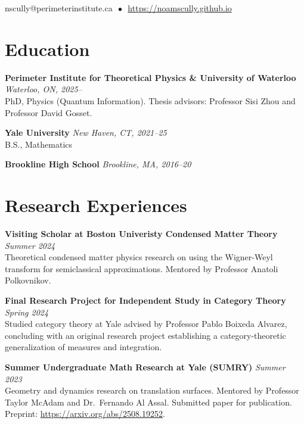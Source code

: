 \documentclass[11pt]{article}
\newcommand{\entry}[3]{
    \vspace{-.58em}
    \textbf{#1} \hfill \textit{#2} \\
    #3 \vspace{0.5em}}
\begin{document}
\begin{center}

  
  \vspace{-.1em}
  \hspace{-.8em}
  nscully@perimeterinstitute.ca $\, \bullet \,$ \href{https://noamscully.github.io}{https://noamscully.github.io}

\end{center}
\vspace{-0.3em}

\section*{Education}
\vspace{.58em}
\vspace{-0.1em}

\entry{Perimeter Institute for Theoretical Physics \& University of Waterloo}{Waterloo, ON, 2025--}{
PhD, Physics (Quantum Information). Thesis advisors: Professor Sisi Zhou and Professor David Gosset.
}

\entry{Yale University}{New Haven, CT, 2021--25}{
B.S., Mathematics
}

\entry{Brookline High School}{Brookline, MA, 2016--20}{
\vspace{-\baselineskip}
}


\section*{Research Experiences}
\vspace{.58em}
\vspace{-0.1em}

\entry{Visiting Scholar at Boston Univeristy Condensed Matter Theory}{Summer 2024}{
Theoretical condensed matter physics research on using the Wigner-Weyl transform for semiclassical approximations. Mentored by Professor Anatoli Polkovnikov.
}

\entry{Final Research Project for Independent Study in Category Theory}{Spring 2024}{
Studied category theory at Yale advised by Professor Pablo Boixeda Alvarez, concluding with an original research project establishing a category-theoretic generalization of measures and integration. 
}

\entry{Summer Undergraduate Math Research at Yale (SUMRY)}{Summer 2023}{
Geometry and dynamics research on translation surfaces. Mentored by Professor Taylor McAdam and Dr.\ Fernando Al Assal. Submitted paper for publication. Preprint: \href{https://arxiv.org/abs/2508.19252}{https://arxiv.org/abs/2508.19252}.
}
\end{document}
